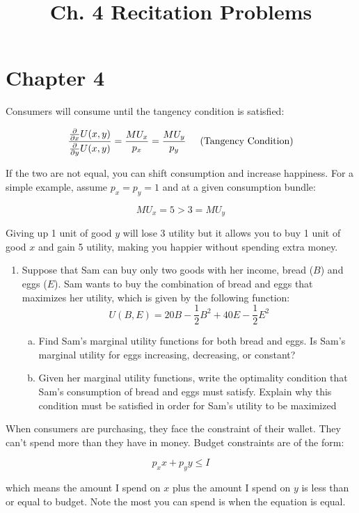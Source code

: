 \documentclass[11pt]{article}
\title{Ch. 4 Recitation Problems}
\begin{document}
  
\section*{Chapter 4}

\begin{tcolorbox}[title= {\bf Optimal Consumption:}]
  Consumers will consume until the tangency condition is satisfied:

  $$\frac{\frac{\partial}{\partial x} U(x,y)}{\frac{\partial}{\partial y} U(x,y)} =  \frac{MU_x}{p_x} = \frac{MU_y}{p_y} \hspace{5mm} \text{(Tangency Condition)} $$

  \vspace{2.5mm}
  If the two are not equal, you can shift consumption and increase happiness. For a simple example, assume $p_x = p_y = 1$ and at a given consumption bundle:
  
  $$MU_x = 5 > 3 = MU_y$$ 
  
  \vspace{2.5mm}
  Giving up 1 unit of good $y$ will lose 3 utility but it allows you to buy 1 unit of good $x$ and gain 5 utility, making you happier without spending extra money.
\end{tcolorbox}

\begin{enumerate}
  \item Suppose that Sam can buy only two goods with her income, bread ($B$) and eggs ($E$). Sam wants to buy the combination of bread and eggs that maximizes her utility, which is given by the following function:
  $$ 
    U(B,E) = 20B - \frac{1}{2} B^2 + 40E - \frac{1}{2} E^2
  $$

  \begin{enumerate}[(a)]
    \item Find Sam's marginal utility functions for both bread and eggs. Is Sam's marginal utility for eggs increasing, decreasing, or constant?
    

    \vspace*{50mm}
    \item Given her marginal utility functions, write the optimality condition that Sam's consumption of bread and eggs must satisfy. Explain why this condition must be satisfied in order for Sam's utility to be maximized
  
  \end{enumerate}
\end{enumerate}    
  
\newpage
    \begin{tcolorbox}[title= {\bf Budget Constraints}]
      When consumers are purchasing, they face the constraint of their wallet. They can't spend more than they have in money. Budget constraints are of the form: 
      
      $$p_x x + p_y y \leq I$$ 
      
      which means the amount I spend on $x$ plus the amount I spend on $y$ is less than or equal to budget. Note the most you can spend is when the equation is equal.
      \vspace{-2mm}
    \end{tcolorbox}
\end{document}

